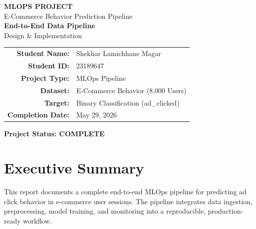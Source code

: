 \documentclass[11pt,a4paper]{article}
\begin{document}
\thispagestyle{empty}

\begin{center}
  \vspace*{2cm}
  
  \textbf{\Large\color{bcublue} MLOPS PROJECT}\\[0.5cm]
  {\color{darkgrey} E-Commerce Behavior Prediction Pipeline}\\[3cm]

  {\Huge\bfseries\color{black} End-to-End Data Pipeline}\\[0.3cm]
  {\Large\color{darkgrey} Design \& Implementation}\\[3cm]

  \begin{tabular}{rl}
    \textbf{Student Name:}    & Shekhar Lamichhane Magar \\[4pt]
    \textbf{Student ID:}      & 23189647 \\[4pt]
    \textbf{Project Type:}    & MLOps Pipeline \\[4pt]
    \textbf{Dataset:}         & E-Commerce Behavior (8,000 Users) \\[4pt]
    \textbf{Target:}          & Binary Classification (ad\_clicked) \\[4pt]
    \textbf{Completion Date:} & May 29, 2026 \\
  \end{tabular}
  
  \vspace*{3cm}
  
  \textbf{\Large\color{midblue} Project Status: COMPLETE}
\end{center}

\newpage

\tableofcontents
\newpage

\section{Executive Summary}

This report documents a complete end-to-end MLOps pipeline for predicting ad click behavior
in e-commerce user sessions. The pipeline integrates data ingestion, preprocessing, model
training, and monitoring into a reproducible, production-ready workflow.
\end{document}
